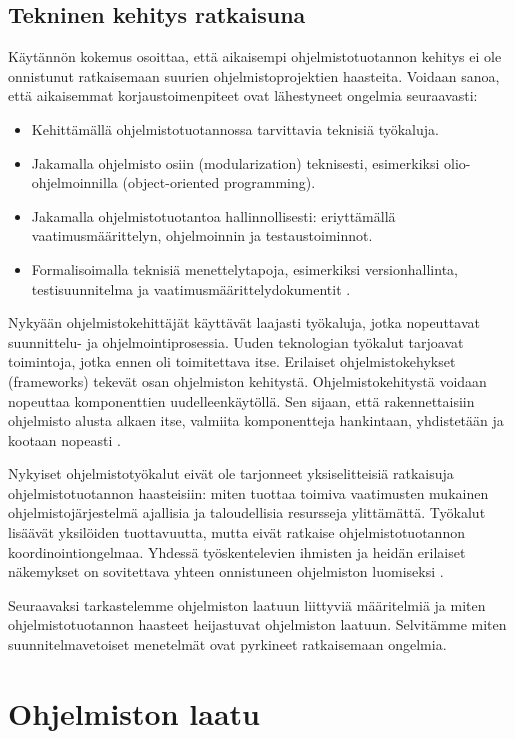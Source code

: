 \documentclass[finnish]{tktltiki2}
\theoremstyle{definition}
\theoremstyle{remark}
\begin{document}
\subsection{Tekninen kehitys ratkaisuna}

Käytännön kokemus osoittaa, että aikaisempi ohjelmistotuotannon kehitys ei ole onnistunut ratkaisemaan suurien ohjelmistoprojektien haasteita. 
Voidaan sanoa, että aikaisemmat korjaustoimenpiteet ovat lähestyneet ongelmia seuraavasti: 
\begin{itemize}
 \item Kehittämällä ohjelmistotuotannossa tarvittavia teknisiä työkaluja.
 \item Jakamalla ohjelmisto osiin (modularization) teknisesti, esimerkiksi olio-ohjelmoinnilla (object-oriented programming). 
 \item Jakamalla ohjelmistotuotantoa hallinnollisesti: eriyttämällä vaatimusmäärittelyn, ohjelmoinnin ja testaustoiminnot.
 \item Formalisoimalla teknisiä menettelytapoja, esimerkiksi versionhallinta, testisuunnitelma ja vaatimusmäärittelydokumentit \cite{KES95}.
\end{itemize}

Nykyään ohjelmistokehittäjät käyttävät laajasti työkaluja, jotka nopeuttavat suunnittelu- ja ohjelmointiprosessia. Uuden teknologian työkalut tarjoavat toimintoja, jotka ennen oli toimitettava itse. Erilaiset ohjelmistokehykset (frameworks) tekevät osan ohjelmiston kehitystä. Ohjelmistokehitystä voidaan nopeuttaa komponenttien uudelleenkäytöllä. Sen sijaan, että rakennettaisiin ohjelmisto alusta alkaen itse, valmiita komponentteja hankintaan, yhdistetään ja kootaan nopeasti \cite{BRL03}.

Nykyiset ohjelmistotyökalut eivät ole tarjonneet yksiselitteisiä ratkaisuja ohjelmistotuotannon haasteisiin: miten tuottaa toimiva vaatimusten mukainen ohjelmistojärjestelmä ajallisia ja taloudellisia resursseja ylittämättä. Työkalut lisäävät yksilöiden tuottavuutta, mutta eivät ratkaise ohjelmistotuotannon koordinointiongelmaa. Yhdessä työskentelevien ihmisten ja heidän erilaiset näkemykset on sovitettava yhteen onnistuneen ohjelmiston luomiseksi \cite{KES95}.

Seuraavaksi tarkastelemme ohjelmiston laatuun liittyviä määritelmiä ja miten ohjelmistotuotannon haasteet heijastuvat ohjelmiston laatuun. Selvitämme miten suunnitelmavetoiset menetelmät ovat pyrkineet ratkaisemaan ongelmia.

\section{Ohjelmiston laatu}
\end{document}
